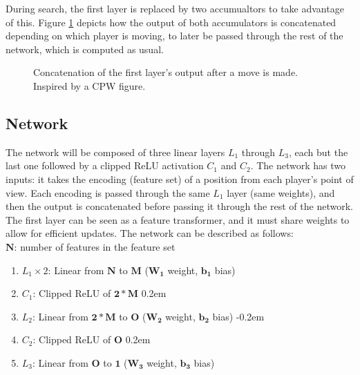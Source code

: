 During search, the first layer is replaced by two accumualtors to take advantage of this. Figure \ref{fig:incr_update} depicts how the output of both accumulators is concatenated depending on which player is moving, to later be passed through the rest of the network, which is computed as usual. 

\begin{figure}[H]
\centering
{}
\caption{Concatenation of the first layer's output after a move is made. Inspired by a CPW figure.}
\label{fig:incr_update}
\end{figure}

\subsection{Network}

The network will be composed of three linear layers $L_1$ through $L_3$, each but the last one followed by a clipped ReLU activation $C_1$ and $C_2$. The network has two inputs: it takes the encoding (feature set) of a position from each player's point of view. Each encoding is passed through the same $L_1$ layer (same weights), and then the output is concatenated before passing it through the rest of the network. The first layer can be seen as a feature transformer, and it must share weights to allow for efficient updates. The network can be described as follows: \\

$\bm{N}$: number of features in the feature set

\begin{enumerate}
\itemsep-0.2em
\item $L_1 \times 2$: Linear from $\bm{N}$ to $\bm{M}$ ($\bm{W_1}$ weight, $\bm{b_1}$ bias)
\item $C_1$: Clipped ReLU of $\bm{2 * M}$
\itemsep0.2em
\item $L_2$: Linear from $\bm{2 * M}$ to $\bm{O}$ ($\bm{W_2}$ weight, $\bm{b_2}$ bias)
\itemsep-0.2em
\item $C_2$: Clipped ReLU of $\bm{O}$
\itemsep0.2em
\item $L_3$: Linear from $\bm{O}$ to $\bm{1}$ ($\bm{W_3}$ weight, $\bm{b_3}$ bias)
\end{enumerate}



